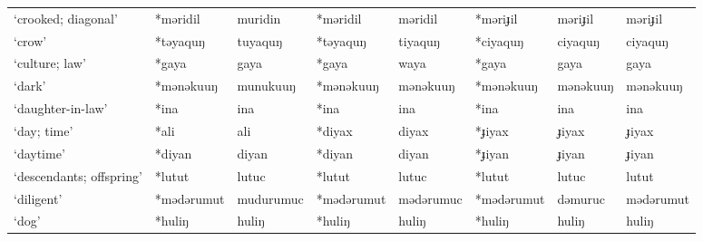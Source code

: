 \begin{landscape}
\begin{longtable}[c]{@{}p{3cm}<{\raggedright}p{2.75cm}<{\raggedright}p{2.75cm}<{\raggedright}p{2.75cm}<{\raggedright}p{2.75cm}<{\raggedright}p{2.75cm}<{\raggedright}p{2.75cm}<{\raggedright}p{2.75cm}<{\raggedright}@{}}
`crooked; diagonal'                                  & *məridil     & muridin                       & *məridil       & məridil                    & *məriɟil         & məriɟil                  & məriɟil                           \\
`crow'                                               & *təyaquŋ     & tuyaquŋ                       & *təyaquŋ       & tiyaquŋ                    & *ciyaquŋ         & ciyaquŋ                  & ciyaquŋ                           \\
`culture; law'                                       & *gaya        & gaya                          & *gaya          & waya                       & *gaya            & gaya                     & gaya                              \\
`dark'                                               & *mənəkuuŋ    & munukuuŋ                      & *mənəkuuŋ      & mənəkuuŋ                   & *mənəkuuŋ        & mənəkuuŋ                 & mənəkuuŋ                          \\
`daughter-in-law'                                    & *ina         & ina                           & *ina           & ina                        & *ina             & ina                      & ina                               \\
`day; time'                                          & *ali         & ali                           & *diyax         & diyax                      & *ɟiyax           & ɟiyax                    & ɟiyax                             \\
`daytime'                                            & *diyan       & diyan                         & *diyan         & diyan                      & *ɟiyan           & ɟiyan                    & ɟiyan                             \\
`descendants; offspring'                             & *lutut       & lutuc                         & *lutut         & lutuc                      & *lutut           & lutuc                    & lutut                             \\
`diligent'                                           & *mədərumut   & mudurumuc                     & *mədərumut     & mədərumuc                  & *mədərumut       & dəmuruc                  & mədərumut                         \\
`dog'                                                & *huliŋ       & huliŋ                         & *huliŋ         & huliŋ                      & *huliŋ           & huliŋ                    & huliŋ                             \\

\end{longtable}
\end{landscape}
